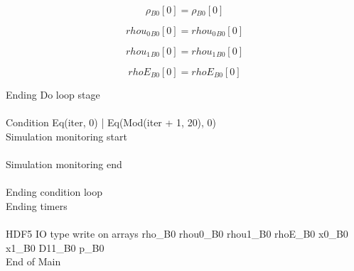 \documentclass{article}
\begin{document}
\begin{dmath}{\rho{_{B0}}}[{0}] = {\rho{_{B0}}}[{0}]\end{dmath}

\begin{dmath}{rhou_{0}{_{B0}}}[{0}] = {rhou_{0}{_{B0}}}[{0}]\end{dmath}

\begin{dmath}{rhou_{1}{_{B0}}}[{0}] = {rhou_{1}{_{B0}}}[{0}]\end{dmath}

\begin{dmath}{rhoE{_{B0}}}[{0}] = {rhoE{_{B0}}}[{0}]\end{dmath}

\noindent Ending Do loop stage\\
\\\noindent Condition Eq(iter, 0) | Eq(Mod(iter + 1, 20), 0)\\\noindent Simulation monitoring start\\
\\\noindent Simulation monitoring end\\
\\\noindent Ending condition loop %
\\\noindent Ending timers\\
\\\noindent HDF5 IO type write on arrays rho_B0 rhou0_B0 rhou1_B0 rhoE_B0 x0_B0 x1_B0 D11_B0 p_B0\\\noindent End of Main\\
\end{document}
